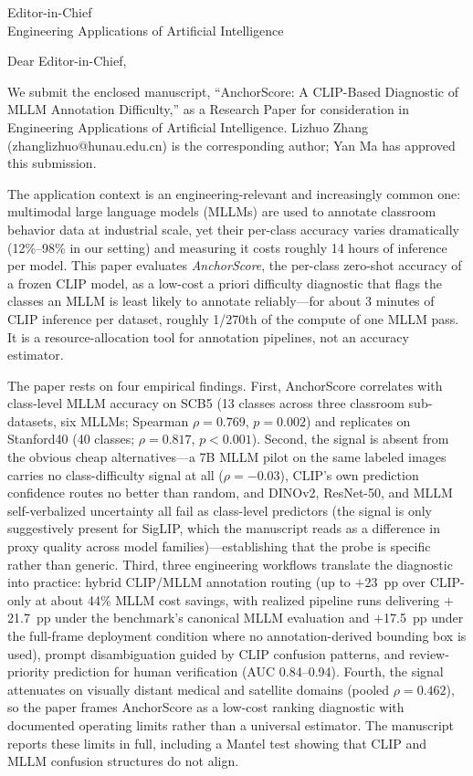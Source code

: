 \documentclass[10pt]{letter}
\begin{document}
\begin{letter}{Editor-in-Chief \\ Engineering Applications of Artificial Intelligence}

\opening{Dear Editor-in-Chief,}

We submit the enclosed manuscript, ``AnchorScore: A CLIP-Based Diagnostic of MLLM Annotation Difficulty,'' as a Research Paper for consideration in Engineering Applications of Artificial Intelligence. Lizhuo Zhang (zhanglizhuo@hunau.edu.cn) is the corresponding author; Yan Ma has approved this submission.

The application context is an engineering-relevant and increasingly common one: multimodal large language models (MLLMs) are used to annotate classroom behavior data at industrial scale, yet their per-class accuracy varies dramatically (12\%--98\% in our setting) and measuring it costs roughly 14 hours of inference per model. This paper evaluates \emph{AnchorScore}, the per-class zero-shot accuracy of a frozen CLIP model, as a low-cost a priori difficulty diagnostic that flags the classes an MLLM is least likely to annotate reliably---for about 3 minutes of CLIP inference per dataset, roughly 1/270th of the compute of one MLLM pass. It is a resource-allocation tool for annotation pipelines, not an accuracy estimator.

The paper rests on four empirical findings. First, AnchorScore correlates with class-level MLLM accuracy on SCB5 (13 classes across three classroom sub-datasets, six MLLMs; Spearman $\rho{=}0.769$, $p{=}0.002$) and replicates on Stanford40 (40 classes; $\rho{=}0.817$, $p{<}0.001$). Second, the signal is absent from the obvious cheap alternatives---a 7B MLLM pilot on the same labeled images carries no class-difficulty signal at all ($\rho{=}{-}0.03$), CLIP's own prediction confidence routes no better than random, and DINOv2, ResNet-50, and MLLM self-verbalized uncertainty all fail as class-level predictors (the signal is only suggestively present for SigLIP, which the manuscript reads as a difference in proxy quality across model families)---establishing that the probe is specific rather than generic. Third, three engineering workflows translate the diagnostic into practice: hybrid CLIP/MLLM annotation routing (up to $+$23~pp over CLIP-only at about 44\% MLLM cost savings, with realized pipeline runs delivering $+$21.7~pp under the benchmark's canonical MLLM evaluation and $+$17.5~pp under the full-frame deployment condition where no annotation-derived bounding box is used), prompt disambiguation guided by CLIP confusion patterns, and review-priority prediction for human verification (AUC 0.84--0.94). Fourth, the signal attenuates on visually distant medical and satellite domains (pooled $\rho{=}0.462$), so the paper frames AnchorScore as a low-cost ranking diagnostic with documented operating limits rather than a universal estimator. The manuscript reports these limits in full, including a Mantel test showing that CLIP and MLLM confusion structures do not align.


\end{letter}
\end{document}
